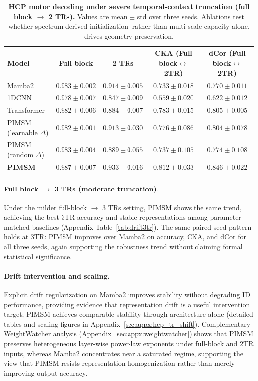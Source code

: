 \documentclass{article}
\begin{document}
\begin{table}[htbp]
\centering
\footnotesize
\begin{tabular}{lcccc}
\toprule
Model & Full block & 2 TRs & CKA (Full block$\leftrightarrow$2TR) & dCor (Full block$\leftrightarrow$2TR) \\
\midrule
Mamba2 & $0.983\pm0.002$ & $0.914\pm0.005$ & $0.733\pm0.018$ & $0.770\pm0.011$ \\
1DCNN & $0.978\pm0.007$ & $0.847\pm0.009$ & $0.559\pm0.020$ & $0.622\pm0.012$ \\
Transformer & $0.982\pm0.006$ & $0.884\pm0.007$ & $0.783\pm0.015$ & $0.805\pm0.005$ \\
PIMSM (learnable $\Delta$) & $0.982\pm0.001$ & $0.913\pm0.030$ & $0.776\pm0.086$ & $0.804\pm0.078$ \\
PIMSM (random $\Delta$) & $0.983\pm0.004$ & $0.889\pm0.055$ & $0.737\pm0.105$ & $0.774\pm0.108$ \\
\midrule
\textbf{PIMSM} & $\mathbf{0.987\pm0.007}$ & $\mathbf{0.933\pm0.016}$ & $\mathbf{0.812\pm0.033}$ & $\mathbf{0.846\pm0.022}$ \\
\bottomrule
\end{tabular}
\caption{
\textbf{HCP motor decoding under severe temporal-context truncation (full block $\rightarrow$ 2 TRs).}
Values are mean $\pm$ std over three seeds. Ablations test whether spectrum-derived initialization, rather than multi-scale capacity alone, drives geometry preservation.
}
\label{tab:drift2tr}
\end{table}

\paragraph{Full block $\rightarrow$ 3 TRs (moderate truncation).}
Under the milder full-block $\rightarrow$ 3 TRs setting, PIMSM shows the same trend, achieving the best 3TR accuracy and stable representations among parameter-matched baselines (Appendix Table~\ref{tab:drift3tr}).
The same paired-seed pattern holds at 3TR: PIMSM improves over Mamba2 on accuracy, CKA, and dCor for all three seeds, again supporting the robustness trend without claiming formal statistical significance.

\paragraph{Drift intervention and scaling.}
Explicit drift regularization on Mamba2 improves stability without degrading ID performance, providing evidence that representation drift is a useful intervention target; PIMSM achieves comparable stability through architecture alone (detailed tables and scaling figures in Appendix~\ref{sec:appx:hcp_tr_shift}).
Complementary WeightWatcher analysis (Appendix~\ref{sec:appx:weightwatcher}) shows that PIMSM preserves heterogeneous layer-wise power-law exponents under full-block and 2TR inputs, whereas Mamba2 concentrates near a saturated regime, supporting the view that PIMSM resists representation homogenization rather than merely improving output accuracy.
\end{document}
